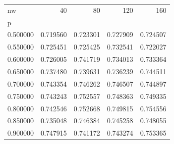 \begin{tabular}{lrrrr}
\toprule
nw & 40 & 80 & 120 & 160 \\
p &  &  &  &  \\
\midrule
0.500000 & 0.719560 & 0.723301 & 0.727909 & 0.724507 \\
0.550000 & 0.725451 & 0.725425 & 0.732541 & 0.722027 \\
0.600000 & 0.726005 & 0.741719 & 0.734013 & 0.733364 \\
0.650000 & 0.737480 & 0.739631 & 0.736239 & 0.744511 \\
0.700000 & 0.743354 & 0.746262 & 0.746507 & 0.744897 \\
0.750000 & 0.743243 & 0.752557 & 0.748363 & 0.749335 \\
0.800000 & 0.742546 & 0.752668 & 0.749815 & 0.754556 \\
0.850000 & 0.735048 & 0.746384 & 0.745258 & 0.748055 \\
0.900000 & 0.747915 & 0.741172 & 0.743274 & 0.753365 \\
\bottomrule
\end{tabular}
